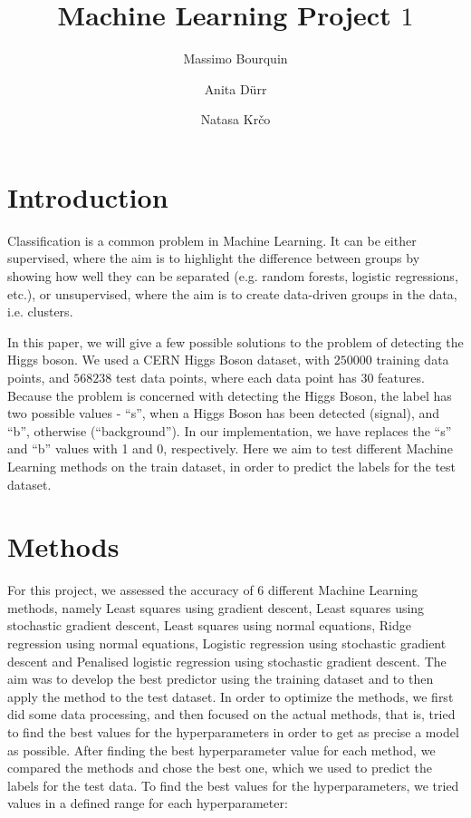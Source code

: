 \documentclass{article}
\begin{document}
	\title{Machine Learning Project $1$}
	
	\author{Massimo Bourquin \and Anita D\" urr \and Natasa Kr\v co}
	
	\maketitle
	
	\section{Introduction}
	
	Classification is a common problem in Machine Learning. It can be either supervised, where the aim is to highlight the difference between groups by showing how well they can be separated (e.g. random forests, logistic regressions, etc.), or unsupervised, where the aim is to create data-driven groups in the data, i.e. clusters.
	
	In this paper, we will give a few possible solutions to the problem of detecting the Higgs boson. We used a CERN Higgs Boson dataset, with $250000$ training data points, and $568238$ test data points, where each data point has 30 features. Because the problem is concerned with detecting the Higgs Boson, the label has two possible values - “s”, when a Higgs Boson has been detected (signal), and “b”, otherwise (“background”). In our implementation, we have replaces the “s” and “b” values with 1 and 0, respectively.
	Here we aim to test different Machine Learning methods on the train dataset, in order to predict the labels for the test dataset.
	
	
	\section{Methods}
	For this project, we assessed the accuracy of 6 different Machine Learning methods, namely Least squares using gradient descent, Least squares using stochastic gradient descent, Least squares using normal equations, Ridge regression using normal equations, Logistic regression using stochastic gradient descent and Penalised logistic regression using stochastic gradient descent. The aim was to develop the best predictor using the training dataset and to then apply the method to the test dataset.
	In order to optimize the methods, we first did some data processing, and then focused on the actual methods, that is, tried to find the best values for the hyperparameters in order to get as precise a model as possible. After finding the best hyperparameter value for each method, we compared the methods and chose the best one, which we used to predict the labels for the test data. To find the best values for the hyperparameters, we tried values in a defined range for each hyperparameter:
	
\end{document}
